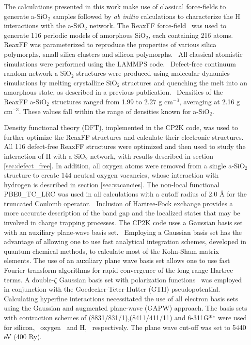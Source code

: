 \documentclass[aps,prb,reprint,superscriptaddress,showpacs]{revtex4-1}
\begin{document}
The calculations presented in this work make use of classical force-fields to generate a-SiO$_2$ samples followed by \emph{ab initio} calculations to characterize the H interactions with the a-SiO$_2$ network. The ReaxFF force-field~\cite{reaxff_sisio} was used to generate 116 periodic models of amorphous SiO$_{2}$, each containing 216 atoms. ReaxFF was parameterized to reproduce the properties of various silica polymorphs, small silica clusters and silicon polymorphs.~\cite{reaxff_h2o} All classical atomistic simulations were performed using the LAMMPS code.~\cite{lammps} Defect-free continuum random network a-SiO$_2$ structures were produced using molecular dynamics simulations by melting crystalline SiO$_2$ structures and quenching the melt into an amorphous state, as described in a previous publication.~\cite{aelsayed_prb} Densities of the ReaxFF a-SiO$_2$ structures ranged from 1.99 to 2.27 g cm$^{-3}$, averaging at 2.16 g cm$^{-3}$. These values fall within the range of densities known for a-SiO$_2$.  

Density functional theory (DFT), implemented in the CP2K code, was used to further optimize the ReaxFF structures and calculate their electronic structures.~\cite{cp2k_code} All 116 defect-free ReaxFF structures were optimized and then used to study the interaction of H with a-SiO$_2$ network, with results described in section \ref{sec:defect_free}. In addition, all oxygen atoms were removed from a single a-SiO$_2$ structure to create 144 neutral oxygen vacancies, whose interaction with hydrogen is described in section \ref{sec:vacancies}. The non-local functional PBE0\_TC\_LRC was used in all calculations with a cutoff radius of 2.0 {\AA} for the truncated Coulomb operator.~\cite{tc_lrc} Inclusion of Hartree-Fock exchange provides a more accurate description of the band gap and the localized states that may be involved in charge trapping processes. The CP2K code uses a Gaussian basis set with an auxiliary plane-wave basis set.~\cite{cp2k_gpw} Employing a Gaussian basis set has the advantage of allowing one to use fast analytical integration schemes, developed in quantum chemical methods, to calculate most of the Kohn-Sham matrix elements. The use of an auxiliary plane wave basis set allows one to use fast Fourier transform algorithms for rapid convergence of the long range Hartree terms. A double-$\zeta$ Gaussian basis set with polarization functions~\cite{dzv_basis} was employed in conjunction with the Goedecker-Teter-Hutter (GTH) pseudopotential.~\cite{gth_pp} Calculating hyperfine interactions necessitated the use of all electron basis sets using the Gaussian and augmented plane-wave (GAPW) approach. The basis sets with contraction schemes of (8831/831/1),(8411/411/11) and 6-311G** were used for silicon,~\cite{si_basis_crystal} oxygen~\cite{o_basis_crystal} and H,~\cite{li_basis_6311gxx} respectively. The plane wave cut-off was set to 5440 eV (400 Ry).
\end{document}
